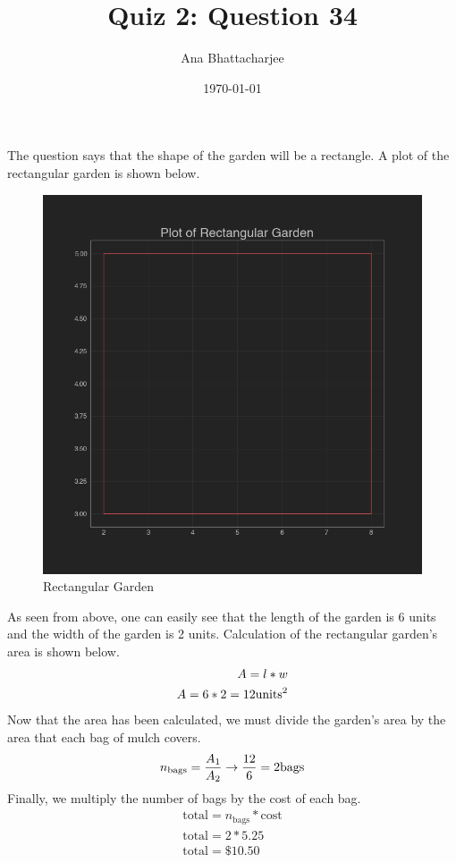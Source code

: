 \documentclass{article}
\begin{document}
\author{Ana Bhattacharjee}
\title{Quiz 2: Question 34}
\date{\today}
\maketitle{}

\begin{center}
The question says that the shape of the garden will be a rectangle. A plot of the rectangular garden is shown below.
\begin{figure}[!htbp]
  \includegraphics[width=0.9\columnwidth]{../../../../../../math/Anna/geometry/coordinate_geometry/quiz2/q34/rectangular_garden}
  \caption{Rectangular Garden}
\end{figure}
\par
As seen from above, one can easily see that the length of the garden is 6 units and the width of the garden is 2 units. Calculation of the rectangular garden's area is shown below.
\begin{align}
  A = l * w \\
  A = 6 * 2 = 12 \vspace{1cm} \text{units}^2
\end{align}
Now that the area has been calculated, we must divide the garden's area by the area that each bag of mulch covers.
\begin{align}
  n_{\text{bags}} = \frac{A_1}{A_2} \rightarrow \frac{12}{6} = 2 \vspace{1cm} \text{bags} \\
\end{align}
Finally, we multiply the number of bags by the cost of each bag.
\begin{align}
  \text{total} = n_{\text{bags}} * \text{cost} \\
  \text{total} = 2 * 5.25 \\
  \text{total} = \$ 10.50
\end{align}
\end{center}
\end{document}
